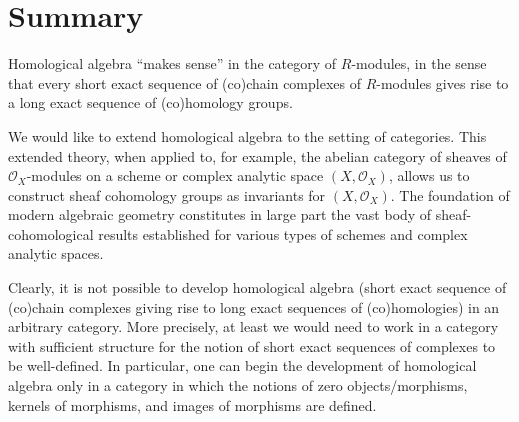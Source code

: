

\section{Summary}
\setcounter{theorem}{0}
\setcounter{equation}{0}


\renewcommand{\theenumi}{\roman{enumi}}
\renewcommand{\labelenumi}{\textnormal{(\theenumi)}$\;\;$}


Homological algebra ``makes sense'' in the category of $R$-modules,
in the sense that every short exact sequence of (co)chain complexes of $R$-modules
gives rise to a long exact sequence of (co)homology groups.

We would like to extend homological algebra to the setting of categories.
This extended theory, when applied to, for example,
the abelian category of sheaves of $\mathcal{O}_{X}$-modules
on a scheme or complex analytic space $(X,\mathcal{O}_{X})$,
allows us to construct sheaf cohomology groups as invariants for $(X,\mathcal{O}_{X})$.
The foundation of modern algebraic geometry constitutes in large part the vast body of sheaf-cohomological results established
for various types of schemes and complex analytic spaces.

Clearly, it is not possible to develop homological algebra
(short exact sequence of (co)chain complexes giving rise to long exact sequences of (co)homologies)
in an arbitrary category.
More precisely, at least we would need to work in a category with sufficient structure
for the notion of short exact sequences of complexes to be well-defined.
In particular, one can begin the development of homological algebra only in a category
in which the notions of zero objects/morphisms, kernels of morphisms, and images of morphisms are defined.

